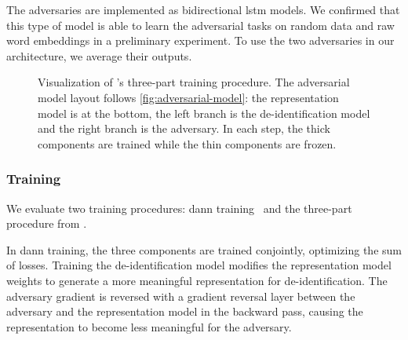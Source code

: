 %
The adversaries are implemented as bidirectional \ac{lstm} models.
%
We confirmed that this type of model is able to learn the adversarial tasks on random data and raw word embeddings in a preliminary experiment.
%
To use the two adversaries in our architecture, we average their outputs.

 \begin{figure}
    \centering
    
    \caption[Adversarial training procedure]{%
        Visualization of \citeauthor{feutry2018learning}'s three-part training procedure.
        The adversarial model layout follows \cref{fig:adversarial-model}: the representation model is at the bottom, the left branch is the de-identification model and the right branch is the adversary.
        In each step, the thick components are trained while the thin components are frozen.
    }\label{fig:feutry-training}
\end{figure}

\subsubsection{Training}
%
We evaluate two training procedures: \ac{dann} training~\citep{ganin2016domain} and the three-part procedure from \citet{feutry2018learning}.

%
In \ac{dann} training, the three components are trained conjointly, optimizing the sum of losses.
%
Training the de-identification model modifies the representation model weights to generate a more meaningful representation for de-identification.
%
The adversary gradient is reversed with a gradient reversal layer between the adversary and the representation model in the backward pass, causing the representation to become less meaningful for the adversary.

